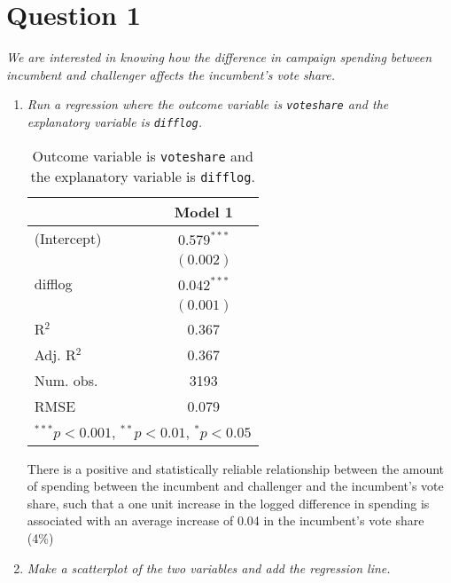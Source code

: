\documentclass[12pt,letterpaper]{article}
\begin{document}
	\section*{Question 1}
	\vspace{.25cm}
	\noindent \emph{We are interested in knowing how the difference in campaign spending between incumbent and challenger affects the incumbent's vote share. }
	\begin{enumerate}
		\item \emph{Run a regression where the outcome variable is \texttt{voteshare} and the explanatory variable is \texttt{difflog}.	}\vspace{.25cm}
			  
			\clearpage

\begin{table}
\begin{center}
	\caption{\footnotesize{Outcome variable is \texttt{voteshare} and the explanatory variable is \texttt{difflog}.}} %
	\label{table:coefficients}
\begin{tabular}{l c }
\hline
 & Model 1 \\
\hline
(Intercept) & $0.579^{***}$ \\
            & $(0.002)$     \\
difflog     & $0.042^{***}$ \\
            & $(0.001)$     \\
\hline
R$^2$       & 0.367         \\
Adj. R$^2$  & 0.367         \\
Num. obs.   & 3193          \\
RMSE        & 0.079         \\
\hline
\multicolumn{2}{l}{\scriptsize{$^{***}p<0.001$, $^{**}p<0.01$, $^*p<0.05$}}
\end{tabular}
\end{center}
\end{table}
		
\vspace{-1cm}
\noindent There is a positive and statistically reliable relationship between the amount of spending between the incumbent and challenger and the incumbent's vote share, such that a one unit increase in the logged difference in spending is associated with an average increase of 0.04 in the incumbent's vote share (4\%)	\vspace{.25cm}
		
		\item \emph{Make a scatterplot of the two variables and add the regression line. }	\vspace{.25cm}
		

\end{enumerate}
\end{document}
